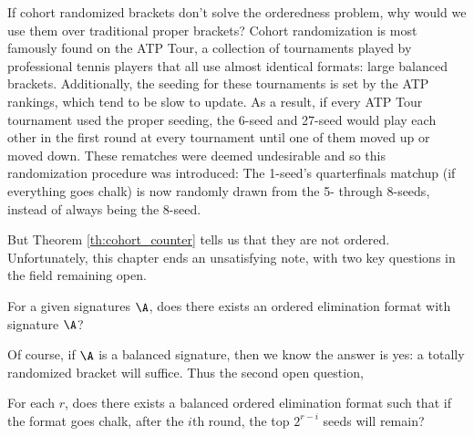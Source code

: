 {    If cohort randomized brackets don't solve the orderedness problem, why would we use them over traditional proper brackets? Cohort randomization is most famously found on the ATP Tour, a collection of tournaments played by professional tennis players that all use almost identical formats: large balanced brackets. Additionally, the seeding for these tournaments is set by the ATP rankings, which tend to be slow to update. As a result, if every ATP Tour tournament used the proper seeding, the 6-seed and 27-seed would play each other in the first round at every tournament until one of them moved up or moved down. These rematches were deemed undesirable and so this randomization procedure was introduced: The 1-seed's quarterfinals matchup (if everything goes chalk) is now randomly drawn from the 5- through 8-seeds, instead of always being the 8-seed.

    But Theorem \ref{th:cohort_counter} tells us that they are not ordered. Unfortunately, this chapter ends an unsatisfying note, with two key questions in the field remaining open.
        
    \begin{oq}{}{}
        For a given signatures $\A$, does there exists an ordered elimination format with signature $\A$?
    \end{oq}

    Of course, if $\A$ is a balanced signature, then we know the answer is yes: a totally randomized bracket will suffice. Thus the second open question,

    \begin{oq}{}{}
        For each $r$, does there exists a balanced ordered elimination format such that if the format goes chalk, after the $i$th round, the top $2^{r-i}$ seeds will remain?
    \end{oq} %

    }
